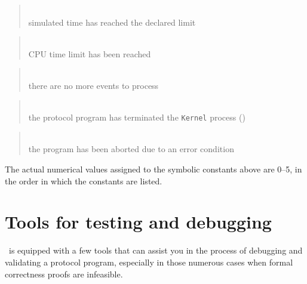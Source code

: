\begin{quote}
\noindent{}\\ \hspace{0in}
simulated time has reached the declared limit
\end{quote}

\begin{quote}
\noindent{}\\ \hspace{0in}
CPU time limit has been reached
\end{quote}

\begin{quote}
\noindent{}\\ \hspace{0in}
there are no more events to process
\end{quote}

\begin{quote}
\noindent{}\\ \hspace{0in}
the protocol program has terminated the {\tt Kernel} process ()
\end{quote}

\begin{quote}
\noindent{}\\ \hspace{0in}
the program has been aborted due to an error condition
\end{quote}\medskip

The actual numerical values assigned to the symbolic constants above
are 0--5, in the order in which the constants are listed.

\section{Tools for testing and debugging}
\label{rm_ob}

\smurph\ is equipped with a few tools that can assist you in the
process of debugging and validating a protocol program, especially in those
numerous cases when formal correctness proofs are infeasible.

